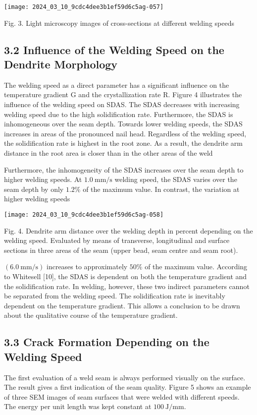 \documentclass[10pt]{article}
\begin{document}
\begin{center}
\texttt{[image: 2024\_03\_10\_9cdc4dee3b1ef59d6c5ag-057]}
\end{center}

Fig. 3. Light microscopy images of cross-sections at different welding speeds

\subsection*{3.2 Influence of the Welding Speed on the Dendrite Morphology}
The welding speed as a direct parameter has a significant influence on the temperature gradient $\mathrm{G}$ and the crystallization rate R. Figure 4 illustrates the influence of the welding speed on SDAS. The SDAS decreases with increasing welding speed due to the high solidification rate. Furthermore, the SDAS is inhomogeneous over the seam depth. Towards lower welding speeds, the SDAS increases in areas of the pronounced nail head. Regardless of the welding speed, the solidification rate is highest in the root zone. As a result, the dendrite arm distance in the root area is closer than in the other areas of the weld

Furthermore, the inhomogeneity of the SDAS increases over the seam depth to higher welding speeds. At $1.0 \mathrm{~mm} / \mathrm{s}$ welding speed, the SDAS varies over the seam depth by only $1.2 \%$ of the maximum value. In contrast, the variation at higher welding speeds

\begin{center}
\texttt{[image: 2024\_03\_10\_9cdc4dee3b1ef59d6c5ag-058]}
\end{center}

Fig. 4. Dendrite arm distance over the welding depth in percent depending on the welding speed. Evaluated by means of transverse, longitudinal and surface sections in three areas of the seam (upper bead, seam centre and seam root).

$(6.0 \mathrm{~mm} / \mathrm{s})$ increases to approximately $50 \%$ of the maximum value. According to Whitesell [10], the SDAS is dependent on both the temperature gradient and the solidification rate. In welding, however, these two indirect parameters cannot be separated from the welding speed. The solidification rate is inevitably dependent on the temperature gradient. This allows a conclusion to be drawn about the qualitative course of the temperature gradient.

\subsection*{3.3 Crack Formation Depending on the Welding Speed}
The first evaluation of a weld seam is always performed visually on the surface. The result gives a first indication of the seam quality. Figure 5 shows an example of three SEM images of seam surfaces that were welded with different speeds. The energy per unit length was kept constant at $100 \mathrm{~J} / \mathrm{mm}$.
\end{document}
